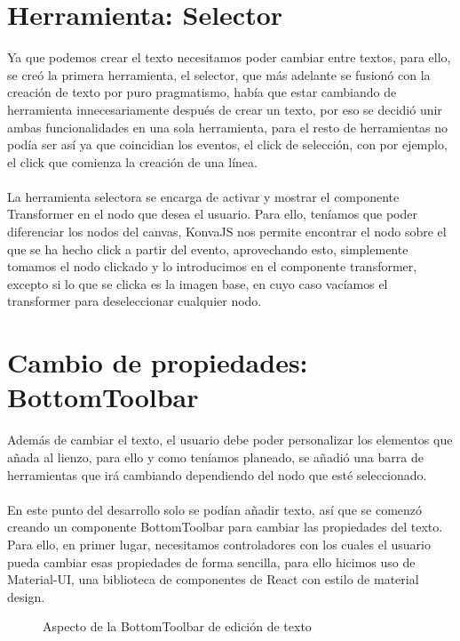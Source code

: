 \section{Herramienta: Selector}
Ya que podemos crear el texto necesitamos poder cambiar entre textos, para ello, se creó
la primera herramienta, el selector, que más adelante se fusionó con la creación de texto
por puro pragmatismo, había que estar cambiando de herramienta innecesariamente después
de crear un texto, por eso se decidió unir ambas funcionalidades en una sola herramienta,
para el resto de herramientas no podía ser así ya que coincidian los eventos, el click 
de selección, con por ejemplo, el click que comienza la creación de una línea.
\\\\
La herramienta selectora se encarga de activar y mostrar el componente Transformer en
el nodo que desea el usuario.
Para ello, teníamos que poder diferenciar los nodos del canvas, KonvaJS\cite{KonvaJS}
nos permite encontrar el nodo sobre el que se ha hecho click a partir del evento, 
aprovechando esto, simplemente tomamos el nodo clickado y lo introducimos en el componente
transformer, excepto si lo que se clicka es la imagen base, en cuyo caso vacíamos el transformer
para deseleccionar cualquier nodo.

\section{Cambio de propiedades: BottomToolbar}


Además de cambiar el texto, el usuario debe poder personalizar los elementos que añada al lienzo,
para ello y como teníamos planeado, se añadió una barra de herramientas que irá cambiando
dependiendo del nodo que esté seleccionado.
\\\\
En este punto del desarrollo solo se podían añadir texto, así que se comenzó creando un componente
BottomToolbar para cambiar las propiedades del texto.
Para ello, en primer lugar, necesitamos controladores con los cuales el usuario pueda cambiar 
esas propiedades de forma sencilla, para ello hicimos uso de Material-UI\cite{materialui}, una 
biblioteca de componentes de React con estilo de material design.
\\
\begin{figure}[!h]
  \centering
  \noindent{}
  \caption{Aspecto de la BottomToolbar de edición de texto}
\end{figure}

